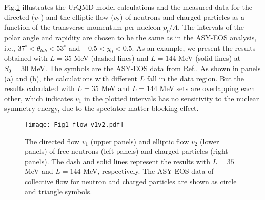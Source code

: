 \documentclass[reprint,aps,prc,twocolumn,superscriptaddress]{revtex4-1}
\begin{document}






Fig.\ref{collective-flow} illustrates the UrQMD model calculations and the measured data for the directed ($v_1$) and the elliptic flow ($v_2$) of neutrons and charged particles as a function of the transverse momentum per nucleon $p_t/A$. The intervals of the polar angle and rapidity are chosen to be the same as in the ASY-EOS analysis, i.e., $37^ {\circ}<\theta_{lab}< 53^ {\circ}$ and $-0.5<y_0<0.5$. As an example, we present the results obtained with $L=35$ MeV (dashed lines) and $L=144$ MeV (solid lines) at $S_0=30$ MeV. The symbols are the ASY-EOS data from Ref.\cite{Russotto2016PRC}. As shown in panels (a) and (b), the calculations with different $L$ fall in the data region. But the results calculated with $L=35$ MeV and $L=144$ MeV sets are overlapping each other, which indicates $v_1$ in the plotted intervals has no sensitivity to the nuclear symmetry energy, due to the spectator matter blocking effect. 




\begin{figure}[htbp]
\centering
\texttt{[image: Fig1-flow-v1v2.pdf]}
\setlength{\abovecaptionskip}{0pt}
\vspace{2em}
\caption{The directed flow $v_1$ (upper panels) and elliptic flow $v_2$ (lower panels) of free neutrons (left panels) and charged particles (right panels). The dash and solid lines represent the results with $L=35$ MeV and $L=144$ MeV, respectively. The ASY-EOS data of collective flow for neutron and charged particles are shown as circle and triangle symbols\cite{Russotto2016PRC}.}
\setlength{\belowcaptionskip}{0pt}
\label{collective-flow}
\end{figure}
\end{document}
